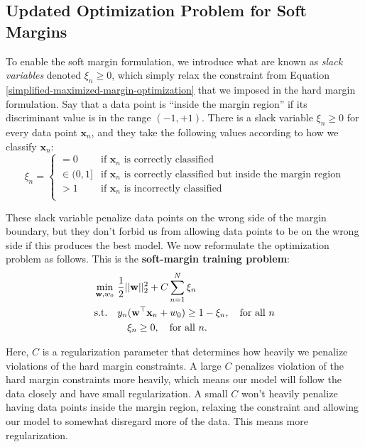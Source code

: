 \subsection{Updated Optimization Problem for Soft Margins}

To enable the soft margin formulation, we introduce what are known as \textit{slack variables} denoted $\xi_{n} \geq 0$, which simply relax the constraint from Equation \ref{simplified-maximized-margin-optimization} that we imposed in the hard margin formulation.
Say that a data point is ``inside the margin region'' if its discriminant value is in the range $(-1,+1)$.
%
There is a slack variable $\xi_{n} \geq 0$ for every data point $\textbf{x}_{n}$, and they take the following values according to how we classify $\textbf{x}_{n}$:
%
\begin{equation} \label{slack-variable-values}
	\xi_{n} = \begin{cases}
	 	= 0 & \text{if  $\textbf{x}_{n}$  is correctly classified} \\
		\in (0, 1] & \text{if $\textbf{x}_{n}$  is correctly classified but inside the  margin region} \\
		> 1 & \text{if $\textbf{x}_{n}$ is  incorrectly classified} \\
	\end{cases}
      \end{equation}
      
      These slack variable penalize data points on the wrong side of the margin boundary, but they don't forbid us from allowing data points to be on the wrong side if this produces the best model.
      We now reformulate the optimization problem as follows. This is the {\bf soft-margin training problem}:
%
%
      \begin{align} \label{soft-margin-optimization-problem}
  \underset{\textbf{w}, w_{0}}{\min}\ &  \frac{1}{2} ||\textbf{w}||_2^{2} + C \sum_{n=1}^{N} \xi_{n}\\
  \mbox{s.t.}\quad & y_{n}(\textbf{w}^\top\textbf{x}_{n} + w_{0}) \geq 1 - \xi_{n}, \quad \mbox{for all $n$} \notag \\
  &\quad \xi_{n} \geq 0, \quad \mbox{for all $n$}. \notag
\end{align}

Here, $C$ is a regularization parameter that determines how heavily we penalize violations of the hard margin constraints. A large $C$ penalizes violation of the hard margin constraints more heavily, which means our model will follow the data closely and have small regularization. A small $C$ won't heavily penalize having data points inside the margin region, relaxing the constraint and allowing our model to somewhat disregard more of the data. This means more regularization.


